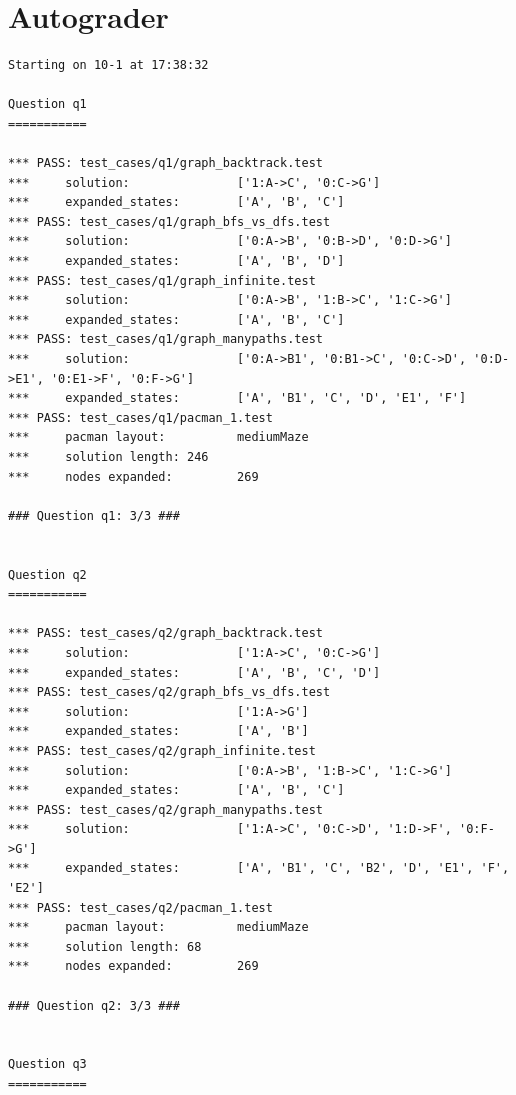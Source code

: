 \documentclass{report}
\begin{document}
      \section{Autograder}
          \begin{lstlisting}
Starting on 10-1 at 17:38:32

Question q1
===========

*** PASS: test_cases/q1/graph_backtrack.test
***     solution:               ['1:A->C', '0:C->G']
***     expanded_states:        ['A', 'B', 'C']
*** PASS: test_cases/q1/graph_bfs_vs_dfs.test
***     solution:               ['0:A->B', '0:B->D', '0:D->G']
***     expanded_states:        ['A', 'B', 'D']
*** PASS: test_cases/q1/graph_infinite.test
***     solution:               ['0:A->B', '1:B->C', '1:C->G']
***     expanded_states:        ['A', 'B', 'C']
*** PASS: test_cases/q1/graph_manypaths.test
***     solution:               ['0:A->B1', '0:B1->C', '0:C->D', '0:D->E1', '0:E1->F', '0:F->G']
***     expanded_states:        ['A', 'B1', 'C', 'D', 'E1', 'F']
*** PASS: test_cases/q1/pacman_1.test
***     pacman layout:          mediumMaze
***     solution length: 246
***     nodes expanded:         269

### Question q1: 3/3 ###


Question q2
===========

*** PASS: test_cases/q2/graph_backtrack.test
***     solution:               ['1:A->C', '0:C->G']
***     expanded_states:        ['A', 'B', 'C', 'D']
*** PASS: test_cases/q2/graph_bfs_vs_dfs.test
***     solution:               ['1:A->G']
***     expanded_states:        ['A', 'B']
*** PASS: test_cases/q2/graph_infinite.test
***     solution:               ['0:A->B', '1:B->C', '1:C->G']
***     expanded_states:        ['A', 'B', 'C']
*** PASS: test_cases/q2/graph_manypaths.test
***     solution:               ['1:A->C', '0:C->D', '1:D->F', '0:F->G']
***     expanded_states:        ['A', 'B1', 'C', 'B2', 'D', 'E1', 'F', 'E2']
*** PASS: test_cases/q2/pacman_1.test
***     pacman layout:          mediumMaze
***     solution length: 68
***     nodes expanded:         269

### Question q2: 3/3 ###


Question q3
===========


\end{lstlisting}
\end{document}
